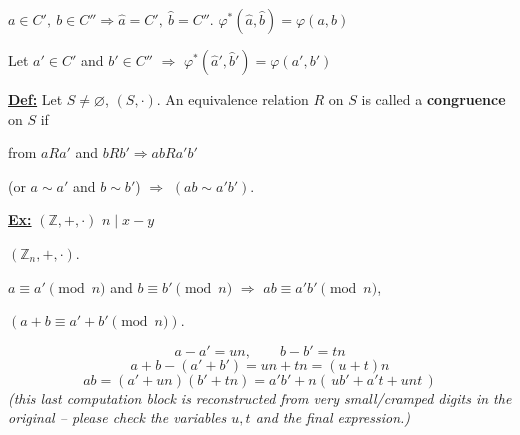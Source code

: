 \documentclass[12pt]{article}
\begin{document}
\noindent $a\in C',\ b\in C'' \Rightarrow \hat a = C',\ \hat b = C''$. \quad $\varphi^*(\hat a,\hat b) = \varphi(a,b)$

\noindent Let $a'\in C'$ and $b'\in C''$ $\Rightarrow$ $\varphi^*(\hat a',\hat b') = \varphi(a',b')$

\bigskip
\noindent\underline{\textbf{Def:}} Let $S\neq\varnothing$, $(S,\cdot)$. An equivalence relation $R$ on $S$ is called a \textbf{congruence} on $S$ if

\noindent from $aRa'$ and $bRb' \Rightarrow abRa'b'$

\noindent (or $a\sim a'$ and $b\sim b'$) $\Rightarrow$ $(ab\sim a'b')$.

\bigskip
\noindent\underline{\textbf{Ex:}} $(\mathbb{Z},+,\cdot)$ \qquad $n \mid x-y$

\noindent $(\mathbb{Z}_n,+,\cdot)$.

\noindent $a\equiv a' \pmod n$ and $b\equiv b' \pmod n$ $\Rightarrow$ $ab\equiv a'b' \pmod n$,

\noindent $(a+b\equiv a'+b' \pmod n)$.

\[
a-a' = un,\qquad b-b'=tn
\]
\[
a+b-(a'+b') = un+tn = (u+t)n
\]
\[
ab = (a'+un)(b'+tn) = a'b' + n(\,ub'+a't+unt\,)
\]
\noindent\textit{(this last computation block is reconstructed from very small/cramped digits in the original -- please check the variables $u,t$ and the final expression.)}
\end{document}
